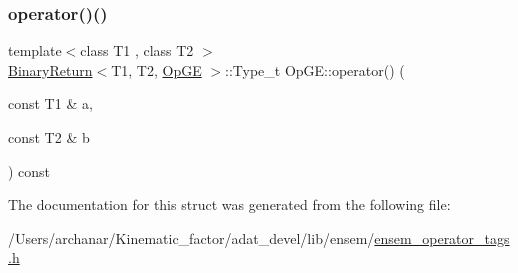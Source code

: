 \mbox{\label{structOpGE_a464b5c9cd38cdcfa8a0d8349c76e99a7}} 
\subsubsection{\texorpdfstring{operator()()}{operator()()}\hspace{0.1cm}{\footnotesize\ttfamily [2/2]}}
{\footnotesize\ttfamily template$<$class T1 , class T2 $>$ \\
\mbox{\hyperlink{structBinaryReturn}{Binary\+Return}}$<$T1, T2, \mbox{\hyperlink{structOpGE}{Op\+GE}} $>$\+::Type\+\_\+t Op\+G\+E\+::operator() (\begin{DoxyParamCaption}\item[{const T1 \&}]{a,  }\item[{const T2 \&}]{b }\end{DoxyParamCaption}) const\hspace{0.3cm}{\ttfamily [inline]}}



The documentation for this struct was generated from the following file\+:\begin{DoxyCompactItemize}
\item 
/\+Users/archanar/\+Kinematic\+\_\+factor/adat\+\_\+devel/lib/ensem/\mbox{\hyperlink{lib_2ensem_2ensem__operator__tags_8h}{ensem\+\_\+operator\+\_\+tags.\+h}}\end{DoxyCompactItemize}
